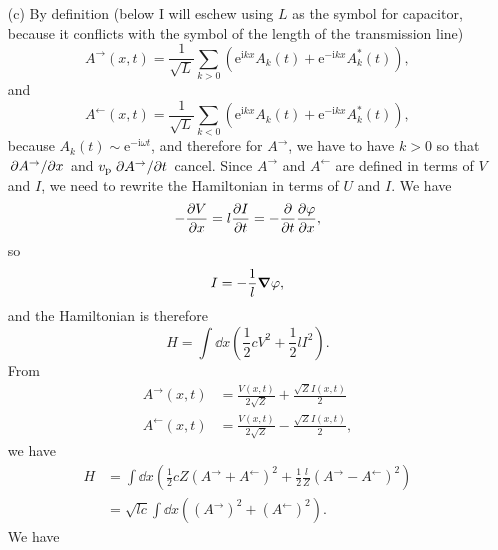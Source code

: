 \documentclass[hyperref, a4paper]{article}
\newcommand*{\ii}{\mathrm{i}}
\newcommand*{\ee}{\mathrm{e}}
\begin{document}
\begin{itemize}
\item[(c)] By definition (below I will eschew using $L$ as the symbol for capacitor,
because it conflicts with the symbol of the length of the transmission line)
\begin{equation}
    A^{\rightarrow}(x, t) = \frac{1}{\sqrt{L}} 
    \sum_{k > 0} (\ee^{\ii k x} A_k(t) + \ee^{- \ii k x} A_k^*(t)),
\end{equation}
and 
\begin{equation}
    A^{\leftarrow}(x, t) = \frac{1}{\sqrt{L}} 
    \sum_{k < 0} (\ee^{\ii k x} A_k(t) + \ee^{- \ii k x} A_k^*(t)),
\end{equation}
because $A_k(t) \sim \ee^{- \ii \omega t}$,
and therefore for $A^\rightarrow$, we have to have $k > 0$
so that $\pdv*{A^\rightarrow}{x}$ and $v_{\text{p}} \pdv*{A^\rightarrow}{t}$ cancel.
Since $A^\rightarrow$ and $A^\leftarrow$ are defined in terms of $V$ and $I$,
we need to rewrite the Hamiltonian in terms of $U$ and $I$.
We have 
\begin{equation}
    - \pdv{V}{x} = l \pdv{I}{t} = - \pdv{t} \pdv{\varphi}{x},
\end{equation}
so 
\begin{equation}
    I = - \frac{1}{l} \grad{\varphi},
\end{equation}
and the Hamiltonian is therefore 
\begin{equation}
    H = \int \dd{x} \left( \frac{1}{2} c V^2 + \frac{1}{2} l I^2 \right).
    \label{eq:transmission-u-i-ham}
\end{equation}
From
\begin{equation}
    \begin{aligned}
        A^{\rightarrow}(x, t) &=\frac{V(x, t)}{2 \sqrt{Z}}+\frac{\sqrt{Z} I(x, t)}{2} \\
        A^{\leftarrow}(x, t) &=\frac{V(x, t)}{2 \sqrt{Z}}-\frac{\sqrt{Z} I(x, t)}{2},
        \end{aligned}
\end{equation}
we have 
\begin{equation}
    \begin{aligned}
        H &= \int \dd{x}
        \left(
            \frac{1}{2} c Z (A^\rightarrow + A^\leftarrow)^2 + 
            \frac{1}{2} \frac{l}{Z} (A^\rightarrow - A^\leftarrow)^2
        \right) \\
        &= \sqrt{lc} \int \dd{x} ((A^{\rightarrow})^2 + (A^{\leftarrow})^2) .
    \end{aligned}
\end{equation}
We have 
\[
    \begin{aligned}

\end{aligned}\]
\end{itemize}
\end{document}
